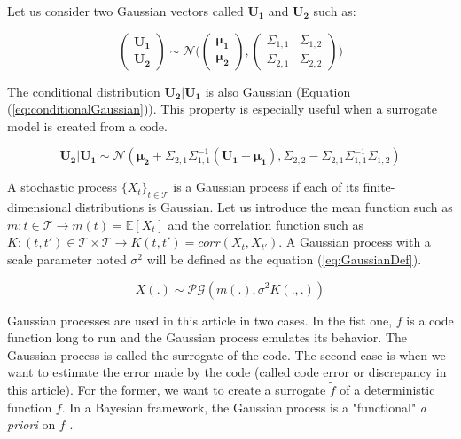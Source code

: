 \documentclass[soumission]{jsfds}
\edef\hc{\string: }
\begin{document}
\begin{appendices}
Let us consider two Gaussian vectors called $\bm{U_1}$ and $\boldsymbol{U_2}$ such as\hc \newline

\begin{equation*}
\begin{pmatrix}
\bm{U_1}\\
\bm{U_2}
\end{pmatrix} \sim \mathcal{N} \Big( \begin{pmatrix}
\bm{\mu_1}\\
\bm{\mu_2}
\end{pmatrix}, \begin{pmatrix}
\Sigma_{1,1} & \Sigma_{1,2}\\
\Sigma_{2,1} & \Sigma_{2,2}
\end{pmatrix} \Big)
\end{equation*}

The conditional distribution $\bm{U_2}|\bm{U_1}$ is also Gaussian (Equation (\ref{eq:conditionalGaussian})). This property is especially useful when a surrogate model is created from a code. \newline

\begin{equation}
\bm{U_2}|\bm{U_1} \sim \mathcal{N}(\bm{\mu_2}+\Sigma_{2,1}\Sigma_{1,1}^{-1}(\bm{U_1}-\bm{\mu_1}), \Sigma_{2,2}-\Sigma_{2,1}\Sigma_{1,1}^{-1}\Sigma_{1,2})
\label{eq:conditionalGaussian}
\end{equation}


A stochastic process $\{X_t\}_{t\in\mathcal{T}}$ is a Gaussian process if each of its finite-dimensional distributions is Gaussian. Let us introduce the mean function such as $m : t\in\mathcal{T} \rightarrow m(t)=\mathbb{E}[X_t]$ and the correlation function such as $ K : (t,t')\in\mathcal{T}\times \mathcal{T}\rightarrow K(t,t')=corr(X_t,X_{t'})$. A Gaussian process with a scale parameter noted $\sigma^2$ will be defined as the equation (\ref{eq:GaussianDef}).

\begin{equation}
X(.) \sim \mathcal{PG}(m(.),\sigma^2K(.,.))
\label{eq:GaussianDef}
\end{equation}

Gaussian processes are used in this article in two cases. In the fist one, $f$ is a code function long to run and the Gaussian process emulates its behavior. The Gaussian process is called the surrogate of the code. The second case is when we want to estimate the error made by the code (called code error or discrepancy in this article). For the former, we want to create a surrogate $\tilde{f}$ of a deterministic function $f$. In a Bayesian framework, the Gaussian process is a "functional" \textit{a priori} on $f$ \citep{currin1991}.\newline


\end{appendices}
\end{document}
